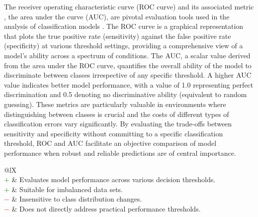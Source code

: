 \documentclass{article}
\begin{document}
The receiver operating characteristic curve (ROC curve) and its associated metric \cite{green1966signal, zweig1993receiver, fawcett2006introduction}, the area under the curve (AUC), are pivotal evaluation tools used in the analysis of classification models \cite{bradley1997use, mandrekar2010receiver, jimenez2012insights}. The ROC curve is a graphical representation that plots the true positive rate (sensitivity) against the false positive rate (specificity) at various threshold settings, providing a comprehensive view of a model's ability across a spectrum of conditions. The AUC, a scalar value derived from the area under the ROC curve, quantifies the overall ability of the model to discriminate between classes irrespective of any specific threshold. A higher AUC value indicates better model performance, with a value of 1.0 representing perfect discrimination and 0.5 denoting no discriminative ability (equivalent to random guessing). These metrics are particularly valuable in environments where distinguishing between classes is crucial and the costs of different types of classification errors vary significantly. By evaluating the trade-offs between sensitivity and specificity without committing to a specific classification threshold, ROC and AUC facilitate an objective comparison of model performance when robust and reliable predictions are of central importance.

\begin{table}[H]\centering
	\begin{tabularx}{\textwidth}{@{}lX}
		 \\
		\textcolor{Green}{$+$} & Evaluates model performance across various decision thresholds. \\
		\textcolor{Green}{$+$} & Suitable for imbalanced data sets. \\
		\textcolor{Red}{$-$}   & Insensitive to class distribution changes. \\
		\textcolor{Red}{$-$}   & Does not directly address practical performance thresholds.
	\end{tabularx}
\end{table}
\end{document}
